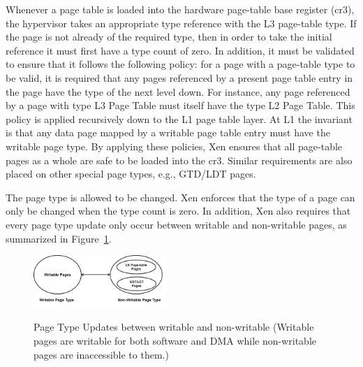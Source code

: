 Whenever a page table is loaded into the hardware page-table base register (cr3),
the hypervisor takes an appropriate type reference with the L3 page-table type.
If the page is not already of the required type, then in order to take the initial reference it must first have a type count of zero.
In addition, it must be validated to ensure that it follows the following policy:
for a page with a page-table type to be valid, it is required that any pages referenced
by a present page table entry in the page have the type of the next level down.
For instance, any page referenced by a page with type L3 Page Table must itself have the type L2 Page Table.
This policy is applied recursively down to the L1 page table layer.
At L1 the invariant is that any data page mapped by a writable page table entry must have the writable page type.
By applying these policies, Xen ensures that all page-table pages as a whole are safe to be loaded into the cr3.
Similar requirements are also placed on other special page types, e.g., GTD/LDT pages.

The page type is allowed to be changed.
Xen enforces that the type of a page can only be changed when the type count is zero.
In addition, Xen also requires that every page type update only occur between writable and non-writable pages, as summarized in Figure~\ref{fig:page-type-updates}.


\begin{figure}[ht]
\centering
\includegraphics[width=0.45\textwidth]{image/background/page-type-updates.png} \\
\caption{Page Type Updates between writable and non-writable (Writable pages are writable for both software and DMA
while non-writable pages are inaccessible to them.)}
\label{fig:page-type-updates}
\end{figure}


